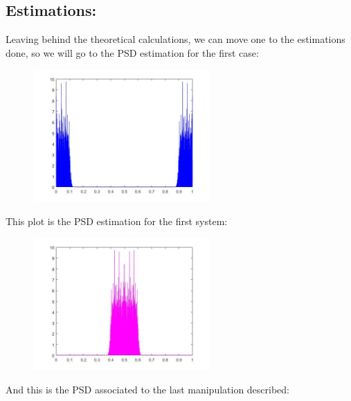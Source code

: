 \documentclass[a4paper,11pt]{article}
\begin{document}
\newpage

\subsection{Estimations:}

Leaving behind the theoretical calculations, we can move one to the estimations done, so we will go to the PSD estimation for the first case:

\begin{figure}[!hp]
    \begin{center}
    \includegraphics[width=0.6\textwidth]{images/lab4_figure7.jpg}
    \end{center}
\end{figure}

This plot is the PSD estimation for the first system:

\begin{figure}[!hp]
    \begin{center}
    \includegraphics[width=0.6\textwidth]{images/lab4_figure8.jpg}
    \end{center}
\end{figure}

\newpage

And this is the PSD associated to the last manipulation described:
\end{document}
